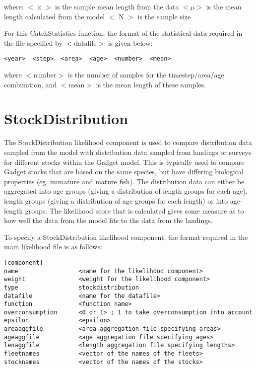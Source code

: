 \documentclass[10pt,twoside]{book}
\begin{document}
where:\newline
$<$ x $>$ is the sample mean length from the data\newline
$<\mu>$ is the mean length calculated from the model\newline
$<$ N $>$ is the sample size

\bigskip
For this CatchStatistics function, the format of the statistical data required in the file specified by $<$datafile$>$ is given below:

{\small\begin{verbatim}
<year>  <step>  <area>  <age>  <number>  <mean>
\end{verbatim}}

where $<$number$>$ is the number of samples for the timestep/area/age combination, and $<$mean$>$ is the mean length of these samples.

\section{StockDistribution}\label{sec:stockdist}
The StockDistribution likelihood component is used to compare distribution data sampled from the model with distribution data sampled from landings or surveys for different stocks within the Gadget model.  This is typically used to compare Gadget stocks that are based on the same species, but have differing biological properties (eg. immature and mature fish).  The distribution data can either be aggregated into age groups (giving a distribution of length groups for each age), length groups (giving a distribution of age groups for each length) or into age-length groups.  The likelihood score that is calculated gives some measure as to how well the data from the model fits to the data from the landings.

\bigskip
To specify a StockDistribution likelihood component, the format required in the main likelihood file is as follows:

{\small\begin{verbatim}
[component]
name                 <name for the likelihood component>
weight               <weight for the likelihood component>
type                 stockdistribution
datafile             <name for the datafile>
function             <function name>
overconsumption      <0 or 1> ; 1 to take overconsumption into account
epsilon              <epsilon>
areaaggfile          <area aggregation file specifying areas>
ageaggfile           <age aggregation file specifying ages>
lenaggfile           <length aggregation file specifying lengths>
fleetnames           <vector of the names of the fleets>
stocknames           <vector of the names of the stocks>
\end{verbatim}}
\end{document}
